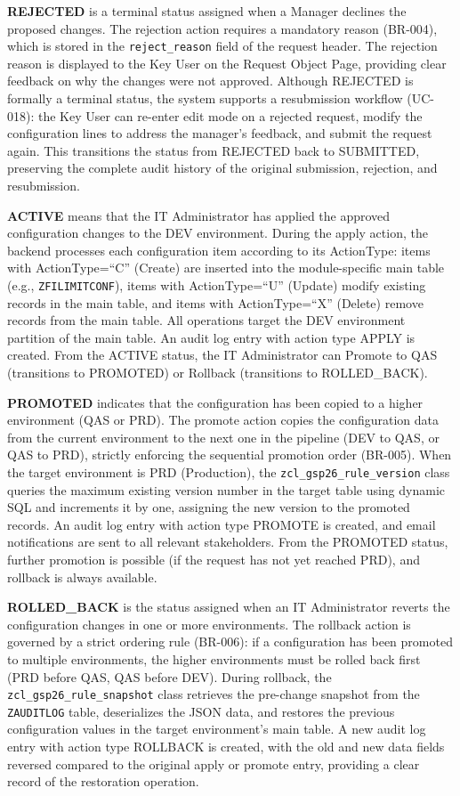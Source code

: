 \documentclass[12pt,a4paper]{report}
\begin{document}
\textbf{REJECTED} is a terminal status assigned when a Manager declines the proposed changes. The rejection action requires a mandatory reason (BR-004), which is stored in the \texttt{reject\_reason} field of the request header. The rejection reason is displayed to the Key User on the Request Object Page, providing clear feedback on why the changes were not approved. Although REJECTED is formally a terminal status, the system supports a resubmission workflow (UC-018): the Key User can re-enter edit mode on a rejected request, modify the configuration lines to address the manager's feedback, and submit the request again. This transitions the status from REJECTED back to SUBMITTED, preserving the complete audit history of the original submission, rejection, and resubmission.

\textbf{ACTIVE} means that the IT Administrator has applied the approved configuration changes to the DEV environment. During the apply action, the backend processes each configuration item according to its ActionType: items with ActionType=``C'' (Create) are inserted into the module-specific main table (e.g., \texttt{ZFILIMITCONF}), items with ActionType=``U'' (Update) modify existing records in the main table, and items with ActionType=``X'' (Delete) remove records from the main table. All operations target the DEV environment partition of the main table. An audit log entry with action type APPLY is created. From the ACTIVE status, the IT Administrator can Promote to QAS (transitions to PROMOTED) or Rollback (transitions to ROLLED\_BACK).

\textbf{PROMOTED} indicates that the configuration has been copied to a higher environment (QAS or PRD). The promote action copies the configuration data from the current environment to the next one in the pipeline (DEV to QAS, or QAS to PRD), strictly enforcing the sequential promotion order (BR-005). When the target environment is PRD (Production), the \texttt{zcl\_gsp26\_rule\_version} class queries the maximum existing version number in the target table using dynamic SQL and increments it by one, assigning the new version to the promoted records. An audit log entry with action type PROMOTE is created, and email notifications are sent to all relevant stakeholders. From the PROMOTED status, further promotion is possible (if the request has not yet reached PRD), and rollback is always available.

\textbf{ROLLED\_BACK} is the status assigned when an IT Administrator reverts the configuration changes in one or more environments. The rollback action is governed by a strict ordering rule (BR-006): if a configuration has been promoted to multiple environments, the higher environments must be rolled back first (PRD before QAS, QAS before DEV). During rollback, the \texttt{zcl\_gsp26\_rule\_snapshot} class retrieves the pre-change snapshot from the \texttt{ZAUDITLOG} table, deserializes the JSON data, and restores the previous configuration values in the target environment's main table. A new audit log entry with action type ROLLBACK is created, with the old and new data fields reversed compared to the original apply or promote entry, providing a clear record of the restoration operation.
\end{document}
